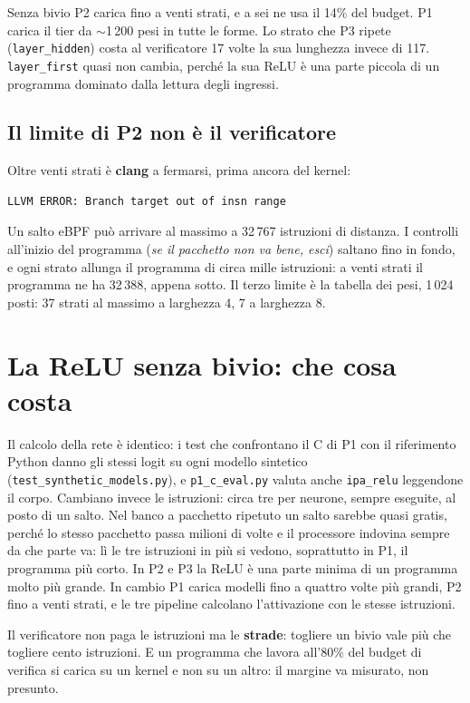 \documentclass[11pt,a4paper,oneside]{report}
\begin{document}
Senza bivio P2 carica fino a venti strati, e a sei ne usa il 14\% del budget.
P1 carica il tier da $\sim$1\,200 pesi in tutte le forme. Lo strato che P3
ripete (\texttt{layer\_hidden}) costa al verificatore 17 volte la sua lunghezza
invece di 117. \texttt{layer\_first} quasi non cambia, perché la sua
ReLU è una parte piccola di un programma dominato dalla lettura degli ingressi.

\subsection*{Il limite di P2 non è il verificatore}

Oltre venti strati è \textbf{clang} a fermarsi, prima ancora del kernel:

\begin{lstlisting}
LLVM ERROR: Branch target out of insn range
\end{lstlisting}

Un salto eBPF può arrivare al massimo a 32\,767 istruzioni di distanza. I
controlli all'inizio del programma (\emph{se il pacchetto non va bene, esci})
saltano fino in fondo, e ogni strato allunga il programma di circa mille
istruzioni: a venti strati il programma ne ha 32\,388, appena sotto. Il terzo
limite è la tabella dei pesi, 1\,024 posti: 37 strati al massimo a larghezza 4,
7 a larghezza 8.

\section{La ReLU senza bivio: che cosa costa}

Il calcolo della rete è identico: i test che confrontano il C di P1 con il
riferimento Python danno gli stessi logit su ogni modello sintetico
(\texttt{test\_synthetic\_models.py}), e \texttt{p1\_c\_eval.py} valuta anche
\texttt{ipa\_relu} leggendone il corpo. Cambiano invece le istruzioni: circa tre
per neurone, sempre eseguite, al posto di un salto. Nel banco a pacchetto
ripetuto un salto sarebbe quasi gratis, perché lo stesso pacchetto passa
milioni di volte e il processore indovina sempre da che parte va: lì le tre
istruzioni in più si vedono, soprattutto in P1, il programma più corto. In P2
e P3 la ReLU è una parte minima di un programma molto più grande. In cambio P1
carica modelli fino a quattro volte più grandi, P2 fino a venti strati, e le
tre pipeline calcolano l'attivazione con le stesse istruzioni.

\begin{lezione}
Il verificatore non paga le istruzioni ma le \textbf{strade}: togliere un bivio
vale più che togliere cento istruzioni. E un programma che lavora all'80\% del
budget di verifica si carica su un kernel e non su un altro: il margine va
misurato, non presunto.
\end{lezione}
\end{document}
